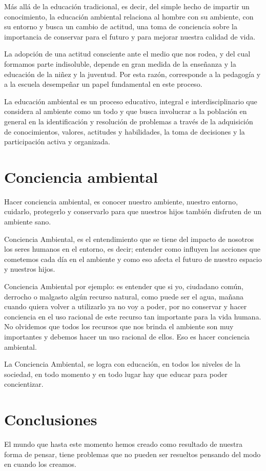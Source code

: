 \documentclass{bmcart}
\begin{document}
	Más allá de la educación tradicional, es decir, del simple hecho de impartir un conocimiento, la educación ambiental relaciona al hombre con su ambiente, con su entorno y busca un cambio de actitud, una toma de conciencia sobre la importancia de conservar para el futuro y para mejorar nuestra calidad de vida.
	
	La adopción de una actitud consciente ante el medio que nos rodea, y del cual formamos parte indisoluble, depende en gran medida de la enseñanza y la educación de la niñez y la juventud. Por esta razón, corresponde a la pedagogía y a la escuela desempeñar un papel fundamental en este proceso.
	
	La educación ambiental es un proceso educativo, integral e interdisciplinario que considera al ambiente como un todo y que busca involucrar a la población en general en la identificación y resolución de problemas a través de la adquisición de conocimientos, valores, actitudes y habilidades, la toma de decisiones y la participación activa y organizada.
	
	\section*{Conciencia ambiental}
	 Hacer conciencia ambiental, es conocer nuestro ambiente, nuestro entorno, cuidarlo, protegerlo y conservarlo para que nuestros hijos también disfruten de un ambiente sano.
	 
	 Conciencia Ambiental, es el entendimiento que se tiene del impacto de nosotros los seres humanos en el entorno, es decir; entender como influyen las acciones que cometemos cada día en el ambiente y como eso afecta el futuro de nuestro espacio y nuestros hijos.
	 
	 Conciencia Ambiental por ejemplo: es entender que si yo, ciudadano común, derrocho o malgasto algún recurso natural, como puede ser el agua, mañana cuando quiera volver a utilizarlo ya no voy a poder, por no conservar y hacer conciencia en el uso racional de este recurso tan importante para la vida humana. No olvidemos que todos los recursos que nos brinda el ambiente son muy importantes y debemos hacer un uso racional de ellos. Eso es hacer conciencia ambiental.
	 
	 La Conciencia Ambiental, se logra con educación,  en todos los niveles de la sociedad, en todo momento y en todo lugar hay que educar para poder concientizar.

	\section*{Conclusiones}
	El mundo que hasta este momento hemos creado como resultado de nuestra forma de pensar, tiene problemas que no pueden ser resueltos pensando del modo en cuando los creamos.
	
\end{document}
